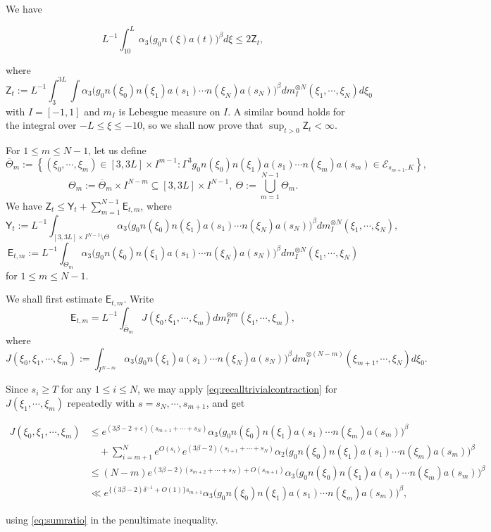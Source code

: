 \documentclass[12pt]{amsart}
\theoremstyle{definition}
\theoremstyle{remark}
\numberwithin{equation}{section}
\newcommand{\cE}{\mathcal{E}}
\newcommand\set[1]{\left\{#1\right\}}
\newcommand{\eqlabel}[2]
{
\begin{equation}
{#2}\label{#1}
\end{equation}
}
\begin{document}
We have
\eqlabel{eq:Ztexpression}{L^{-1}\int_{10}^L \alpha_3\big(g_0n(\xi)a(t)\big)^{\beta}d\xi\leq 2\mathsf{Z}_t,}
where
$$\mathsf{Z}_t:=L^{-1}\int_{3}^{3L}\int \alpha_3\big(g_0n(\xi_0)n(\xi_1)a(s_1)\cdots n(\xi_N)a(s_N)\big)^{\beta}dm_I^{\otimes N}(\xi_1,\cdots,\xi_{N})d\xi_0$$
with $I = [-1,1]$ and $m_I$ is Lebesgue measure on $I$.
A similar bound holds for the integral over $-L \leq \xi \leq -10$, so we shall now prove that $\displaystyle\sup_{t>0}\mathsf{Z}_t<\infty$.
    
    For $1 \leq m \leq N-1$, let us define
    $$\overline{\Theta}_m:=\set{(\xi_0,\cdots,\xi_m)\in [3,3L]\times I^{m-1}: \Gamma^3 g_0n(\xi_0)n(\xi_1)a(s_1)\cdots n(\xi_m)a(s_m)\in \cE_{s_{m+1},K}},$$
    $$\Theta_m:=\overline{\Theta}_m\times I^{N-m}\subseteq [3,3L]\times I^{N-1},\ \Theta:=\bigcup_{m=1}^{N-1}\Theta_m.$$
    We have $\mathsf{Z}_t \leq \mathsf{Y}_t+\sum_{m=1}^{N-1}\mathsf{E}_{t,m}$, where
    $$\mathsf{Y}_t:=L^{-1}\int_{[3,3L]\times I^{N-1}\setminus\Theta} \alpha_3\big(g_0n(\xi_0)n(\xi_1)a(s_1)\cdots n(\xi_N)a(s_N)\big)^{\beta}dm_I^{\otimes N}(\xi_1,\cdots,\xi_{N}),$$
    $$\mathsf{E}_{t,m}:=L^{-1}\int_{\Theta_m} \alpha_3\big(g_0n(\xi_0)n(\xi_1)a(s_1)\cdots n(\xi_N)a(s_N)\big)^{\beta}dm_I^{\otimes N}(\xi_1,\cdots,\xi_{N})$$
    for $1\leq m\leq N-1$. 
    
    We shall first estimate $\mathsf{E}_{t,m}$. Write
    $$\mathsf{E}_{t,m}=L^{-1}\int_{\overline{\Theta}_m}J(\xi_0,\xi_1,\cdots,\xi_m)dm_I^{\otimes m}(\xi_1,\cdots,\xi_m),$$
    where
    $$J(\xi_0,\xi_1,\cdots,\xi_m):=\int_{I^{N-m}}\alpha_3\big(g_0n(\xi_1)a(s_1)\cdots n(\xi_N)a(s_N)\big)^{\beta}dm_I^{\otimes (N-m)}(\xi_{m+1},\cdots,\xi_{N})d\xi_0.$$
    
    Since $s_i\geq T$ for any $1\leq i\leq N$, we may apply \eqref{eq:recalltrivialcontraction} for $J(\xi_1,\cdots,\xi_m)$ repeatedly with $s=s_N,\cdots,s_{m+1}$, and get
    \eqlabel{eq:Badestimate1}{\begin{aligned}
        J(\xi_0,\xi_1,\cdots,\xi_m)&\leq e^{(3\beta-2 + \epsilon)(s_{m+1}+\cdots+s_N)}\alpha_{3}\big(g_0n(\xi_0)n(\xi_1)a(s_1)\cdots n(\xi_m)a(s_m)\big)^{\beta}\\&\quad+\sum_{i=m+1}^{N}e^{O(s_i)}e^{(3\beta-2)(s_{i+1}+\cdots+s_{N})}\alpha_{2}\big(g_0n(\xi_0)n(\xi_1)a(s_1)\cdots n(\xi_m)a(s_m)\big)^{\beta}\\&\leq (N-m)e^{(3\beta-2)(s_{m+2}+\cdots+s_{N})+O(s_{m+1})}\alpha_{3}\big(g_0n(\xi_0)n(\xi_1)a(s_1)\cdots n(\xi_m)a(s_m)\big)^{\beta}\\&\ll e^{\{(3\beta-2)\delta^{-1}+O(1)\}s_{m+1}}\alpha_{3}\big(g_0n(\xi_0)n(\xi_1)a(s_1)\cdots n(\xi_m)a(s_m)\big)^{\beta},
    \end{aligned}}
  using \eqref{eq:sumratio} in the penultimate inequality.
    
\end{document}
